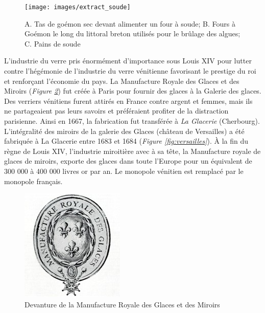 \documentclass[
]{book}
\begin{document}
\begin{figure}

{\centering \texttt{[image: images/extract\_soude]} 

}

\caption{A. Tas de goémon sec devant alimenter un four à soude; B. Fours à Goémon le long du littoral breton utilisés pour le brûlage des algues; C. Pains de soude}\label{fig:soude}
\end{figure}

L'industrie du verre pris énormément d'importance sous Louis XIV pour lutter contre l'hégémonie de l'industrie du verre vénitienne favorisant le prestige du roi et renforçant l'économie du pays.
La Manufacture Royale des Glaces et des Miroirs (\emph{Figure \ref{fig:manufacture}}) fut créée à Paris pour fournir des glaces à la Galerie des glaces. Des verriers vénitiens furent attirés en France contre argent et femmes, mais ils ne partageaient pas leurs savoirs et préféraient profiter de la distraction parisienne. Ainsi en 1667, la fabrication fut transférée à \emph{La Glacerie} (Cherbourg). L'intégralité des miroirs de la galerie des Glaces (château de Versailles) a été fabriquée à La Glacerie entre 1683 et 1684 (\emph{Figure \ref{fig:versailles}}).
À la fin du règne de Louis XIV, l'industrie miroitière avec à sa tête, la Manufacture royale de glaces de miroirs, exporte des glaces dans toute l'Europe pour un équivalent de 300 000 à 400 000 livres or par an. Le monopole vénitien est remplacé par le monopole français.

\begin{figure}

{\centering \includegraphics{images/manufacture_royale} 

}

\caption{Devanture de la Manufacture Royale des Glaces et des Miroirs}\label{fig:manufacture}
\end{figure}
\end{document}
